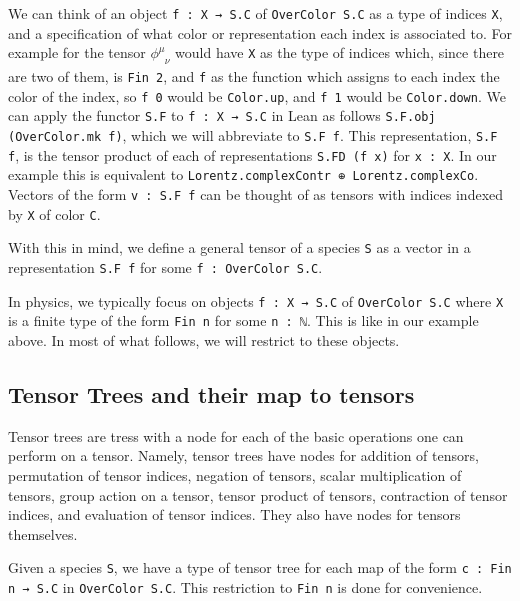\documentclass[a4paper, 11pt]{article}
\DeclareRobustCommand{\myinline}{\lstinline}
\begin{document}
We can think of an object \myinline|f : X → S.C| of \myinline|OverColor S.C| as a type of indices \myinline|X|,
and a specification of what color or representation each index is associated to. 
For example for the tensor $\phi^{\mu}_{\phantom{\mu}\nu}$ would have \myinline|X| as the type of indices which, since there are two of them, 
is \myinline|Fin 2|, and \myinline|f| as the function which assigns to each index the color of the index, 
so \myinline|f 0| would be \myinline|Color.up|, and \myinline|f 1| would be \myinline|Color.down|. 
We can apply the functor \myinline|S.F| to \myinline|f : X → S.C| in Lean as follows 
\myinline|S.F.obj (OverColor.mk f)|, which we will abbreviate to \myinline|S.F f|.
This representation, \myinline|S.F f|, is the tensor product of each of representations \myinline|S.FD (f x)| for \myinline|x : X|. 
In our example this is equivalent to \myinline|Lorentz.complexContr ⊕ Lorentz.complexCo|. Vectors of the form
\myinline|v : S.F f| can be thought of as tensors with indices indexed by \myinline|X| of color \myinline|C|. 

With this in mind, we define a general tensor of a species \myinline|S| as a vector in a representation 
\myinline|S.F f| for some \myinline|f : OverColor S.C|. 

In physics, we typically focus on objects \myinline|f : X → S.C| of \myinline|OverColor S.C|  where \myinline|X| is a 
finite type of the form \myinline|Fin n| for some \myinline|n : ℕ|. 
This is like in our example above. In most of what follows, 
we will restrict to these objects.

\subsection{Tensor Trees and their map to tensors}

Tensor trees are tress with a node for each of the basic operations one can perform on a tensor. 
Namely, tensor trees have nodes for addition of tensors, permutation of tensor indices, negation of tensors, 
  scalar multiplication of tensors, group action on a tensor, tensor product of tensors, contraction of tensor indices,
  and evaluation of tensor indices.
They also have nodes for tensors themselves.

Given a species \myinline|S|, we have a type of tensor tree for each map of the form
\myinline|c : Fin n → S.C| in \myinline|OverColor S.C|. 
This restriction to \myinline|Fin n| is done for convenience.
\end{document}
